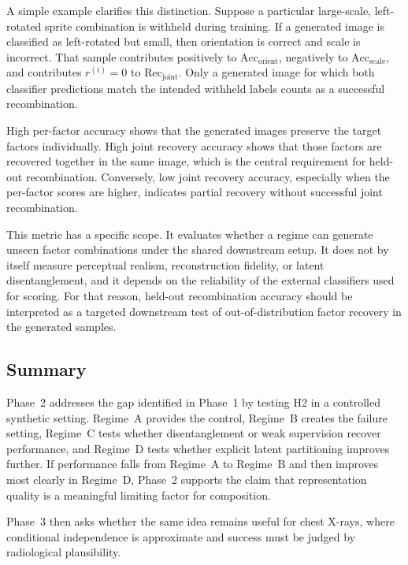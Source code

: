 A simple example clarifies this distinction. Suppose a particular large-scale, left-rotated sprite combination is withheld during training. If a generated image is classified as left-rotated but small, then orientation is correct and scale is incorrect. That sample contributes positively to \(\mathrm{Acc}_{\mathrm{orient}}\), negatively to \(\mathrm{Acc}_{\mathrm{scale}}\), and contributes \(r^{(i)}=0\) to \(\mathrm{Rec}_{\mathrm{joint}}\). Only a generated image for which both classifier predictions match the intended withheld labels counts as a successful recombination.

High per-factor accuracy shows that the generated images preserve the target factors individually. High joint recovery accuracy shows that those factors are recovered together in the same image, which is the central requirement for held-out recombination. Conversely, low joint recovery accuracy, especially when the per-factor scores are higher, indicates partial recovery without successful joint recombination.

This metric has a specific scope. It evaluates whether a regime can generate unseen factor combinations under the shared downstream setup. It does not by itself measure perceptual realism, reconstruction fidelity, or latent disentanglement, and it depends on the reliability of the external classifiers used for scoring. For that reason, held-out recombination accuracy should be interpreted as a targeted downstream test of out-of-distribution factor recovery in the generated samples.
\subsection{Summary}
\label{subsec:p2_bridge}

Phase~2 addresses the gap identified in Phase~1 by testing H2 in a controlled synthetic setting. Regime~A provides the control, Regime~B creates the failure setting, Regime~C tests whether disentanglement or weak supervision recover performance, and Regime~D tests whether explicit latent partitioning improves further. If performance falls from Regime~A to Regime~B and then improves most clearly in Regime~D, Phase~2 supports the claim that representation quality is a meaningful limiting factor for composition.

Phase~3 then asks whether the same idea remains useful for chest X-rays, where
conditional independence is approximate and success must be judged by radiological plausibility.

